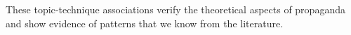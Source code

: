 These topic-technique associations verify the theoretical aspects of propaganda and show evidence of patterns that we know from the literature.














